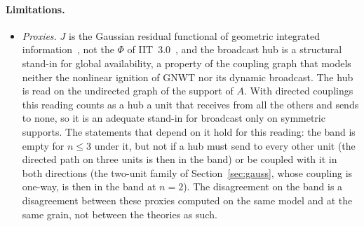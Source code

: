 \paragraph{Limitations.}
\begin{itemize}
\item \emph{Proxies.} $J$ is the Gaussian residual functional of geometric integrated information~\cite{Oizumi2016PNAS}, not the $\Phi$ of IIT~3.0~\cite{Oizumi2014}, and the broadcast hub is a structural stand-in for global availability, a property of the coupling graph that models neither the nonlinear ignition of GNWT nor its dynamic broadcast. The hub is read on the undirected graph of the support of $A$. With directed couplings this reading counts as a hub a unit that receives from all the others and sends to none, so it is an adequate stand-in for broadcast only on symmetric supports. The statements that depend on it hold for this reading: the band is empty for $n\le3$ under it, but not if a hub must send to every other unit (the directed path on three units is then in the band) or be coupled with it in both directions (the two-unit family of Section~\ref{sec:gauss}, whose coupling is one-way, is then in the band at $n=2$). The disagreement on the band is a disagreement between these proxies computed on the same model and at the same grain, not between the theories as such.

\end{itemize}

